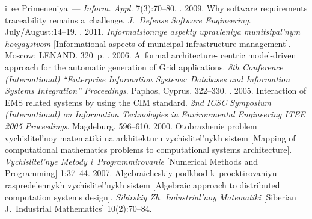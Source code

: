 \begin{multicols}{2}
{{\begin{thebibliography}{99}
{i~ee Primeneniya}~--- \textit{Inform. Appl.}   7(3):70--80.
. 2009. Why software requirements traceability remains 
a~challenge. \textit{J.~Defense Software Engineering}. July/August:14--19.
. 2011. \textit{Informatsionnye 
aspekty upravleniya munitsipal'nym hozyaystvom} [Informational aspects of municipal 
infrastructure management]. Moscow: LENAND. 320~p.
. 2006. A~formal architecture-
centric model-driven approach for the automatic generation of Grid applications. \textit{8th  
Conference (International) ``Enterprise Information Systems: Databases and Information Systems 
Integration'' Proceedings}. Paphos, Cyprus. 322--330.
.  2005. 
Interaction of EMS related systems by using the CIM standard. \textit{2nd ICSC Symposium 
(International) on Information Technologies in Environmental Engineering ITEE 2005 Proceedings}. 
Magdeburg. 596--610.
 2000. Otobrazhenie problem vychislitel'noy matematiki na arkhitekturu 
vychislitel'nykh sistem [Mapping of computational mathematics problems to computational systems 
architecture]. \textit{Vychislitel'nye Metody i~Programmirovanie} [Numerical Methods and 
Programming]  1:37--44.
 2007. Algebraicheskiy podkhod k~proektirovaniyu raspredelennykh 
vychislitel'nykh sistem [Algebraic approach to distributed computation systems design]. 
\textit{Sibirskiy Zh. Industrial'noy Matematiki} [Siberian J.~Industrial Mathematics]  
10(2):70--84.

\columnbreak


\end{thebibliography}}}
\end{multicols}
